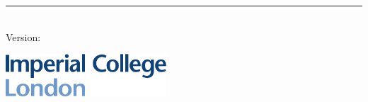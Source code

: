%
\begin{titlepage}
	\flushright
	\hfill
	\vfill
	{\LARGE\thesisTitle \par}
	\rule[5pt]{\textwidth}{.4pt} \par
	{\Large\thesisName}
	\vfill
	\textit{\large\thesisDate} \\
	Version: \thesisVersion
\end{titlepage}


\begin{titlepage}
	\tgherosfont
	\centering

	\includegraphics[width=6cm]{imperial_logo} \\[4mm]
	\textsf{\thesisUniversityDepartment} \\
	\textsf{\thesisUniversityGroup} \\

	\vfill
	{\LARGE \color{ctcolortitle}\textbf{\thesisTitle} \\[10mm]}
	{\Large \thesisName} \\


\end{titlepage}
